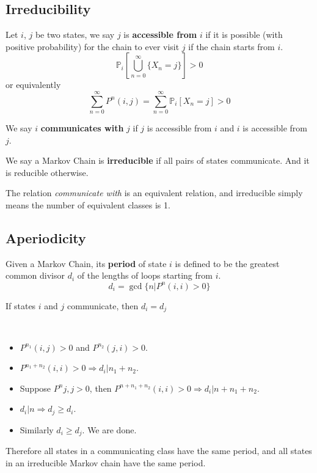 \subsection{Irreducibility}
\begin{definition}[Accessibility]
    Let $i$, $j$ be two states, we say $j$ is \textbf{accessible from} $i$ if it is possible (with positive probability) for the chain to ever visit $j$ if the chain starts from $i$.
    \[ \mathbb{P}_i[\bigcup_{n=0}^\infty\{X_n = j\}] > 0 \]
    or equivalently
    \[ \sum_{n=0}^\infty P^n(i,j) = \sum_{n=0}^\infty \mathbb{P}_i[X_n = j] > 0 \]
\end{definition}

\begin{definition}[Communication]
    We say $i$ \textbf{communicates with} $j$ if $j$ is accessible from $i$ and $i$ is accessible from $j$.
\end{definition}

\begin{definition}[Irreducibility]
    We say a Markov Chain is \textbf{irreducible} if all pairs of states communicate. And it is reducible otherwise.
\end{definition}
The relation \emph{communicate with} is an equivalent relation, and irreducible simply means the number of equivalent classes is 1.

\subsection{Aperiodicity}
\begin{definition}[Period]
    Given a Markov Chain, its \textbf{period} of state $i$ is defined to be the greatest common divisor $d_i$ of the lengths of loops starting from $i$.
    \[ d_i = \gcd\{n|P^n(i,i) > 0\} \]
\end{definition}

\begin{theorem}
    If states $i$ and $j$ communicate, then $d_i = d_j$
\end{theorem}
\begin{sketchproof}
    ~{}
    \begin{itemize}
        \item $P^{n_1}(i,j) > 0$ and $P^{n_2}(j,i) > 0$.
        \item $P^{n_1+n_2}(i,i)>0 \Rightarrow d_i | n_1 + n_2$.
        \item Suppose $P^n{j,j} > 0$, then $P^{n+n_1+n_2}(i,i) > 0 \Rightarrow d_i | n + n_1 + n_2$.
        \item $d_i | n \Rightarrow d_j \ge d_i$.
        \item Similarly $d_i \ge d_j$. We are done.
    \end{itemize}
\end{sketchproof}
\begin{remark}
    Therefore all states in a communicating class have the same period, and all states in an irreducible Markov chain have the same period.
\end{remark}

